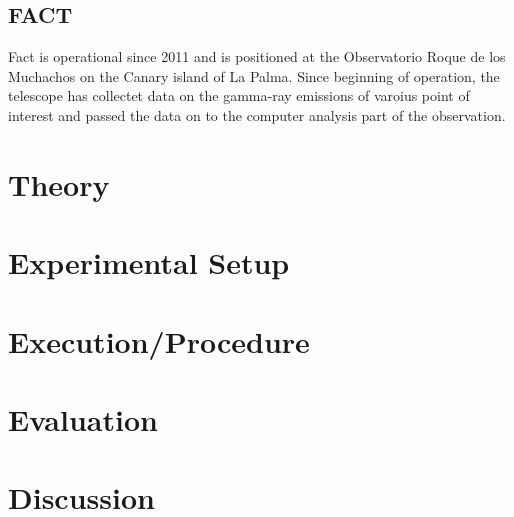     \subsection{FACT}
    Fact is operational since 2011 and is positioned at the Observatorio Roque de los Muchachos on the Canary island of La Palma.
    Since beginning of operation, the telescope has collectet data on the gamma-ray emissions of varoius point of interest and passed the data on to the computer analysis part of the observation.
    
%
%
    \section{Theory}


%
%
    \section{Experimental Setup}

%
%
    \section{Execution/Procedure}
    
%
%
    \section{Evaluation}


%
%
    \section{Discussion}

\newpage
\printbibliography
\newpage

